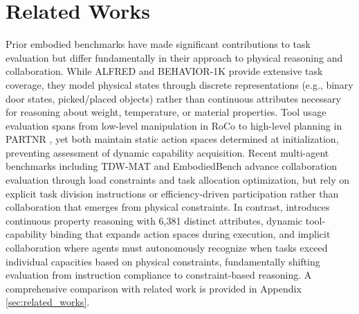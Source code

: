 \section{Related Works}


Prior embodied benchmarks have made significant contributions to task evaluation but differ fundamentally in their approach to physical reasoning and collaboration. While ALFRED \citep{shridhar2020alfredbenchmarkinterpretinggrounded} and BEHAVIOR-1K \citep{li2024behavior} provide extensive task coverage, they model physical states through discrete representations (e.g., binary door states, picked/placed objects) rather than continuous attributes necessary for reasoning about weight, temperature, or material properties. Tool usage evaluation spans from low-level manipulation in RoCo \citep{mandi2024roco} to high-level planning in PARTNR \citep{chang2024partnrbenchmarkplanningreasoning}, yet both maintain static action spaces determined at initialization, preventing assessment of dynamic capability acquisition. Recent multi-agent benchmarks including TDW-MAT \citep{zhang2024buildingcooperativeembodiedagents} and EmbodiedBench \citep{yang2025embodiedbench} advance collaboration evaluation through load constraints and task allocation optimization, but rely on explicit task division instructions or efficiency-driven participation rather than collaboration that emerges from physical constraints. In contrast, \framework introduces continuous property reasoning with 6,381 distinct attributes, dynamic tool-capability binding that expands action spaces during execution, and implicit collaboration where agents must autonomously recognize when tasks exceed individual capacities based on physical constraints, fundamentally shifting evaluation from instruction compliance to constraint-based reasoning. A comprehensive comparison with related work is provided in Appendix \ref{sec:related_works}.